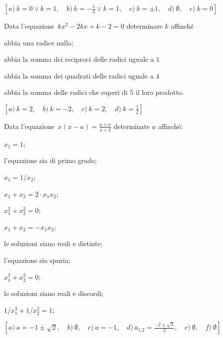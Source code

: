 \begin{flushright}
$\left[a)~ k = 0 \vee k = 1 ,\quad b)~ k =-\frac{1}{3} \vee k = 1 
,\quad c)~ k = \pm 1 ,\quad d)~ \emptyset ,\quad e)~ k=0 \right]$
\end{flushright}

\begin{esercizio}[\Ast]
 \label{ese:3.102}
Data l'equazione~$kx^{2}-2kx + k-2 = 0$ determinare $k$ affinché
\begin{enumeratea}
\item abbia una radice nulla;~
\item abbia la somma dei reciproci delle radici uguale a $1$
\item abbia la somma dei quadrati delle radici uguale a $4$
\item abbia la somma delle radici che superi di $5$ il loro prodotto.
\end{enumeratea}
\end{esercizio}

\begin{flushright}
$\left[a)~ k = 2 ,\quad b)~ k = -2 ,\quad c)~ k = 2 ,\quad 
d)~ k = \frac{1}{2} \right]$
\end{flushright}

\begin{esercizio}[\Ast]
 \label{ese:3.103}
Data l'equazione~$x (x-a) = \frac{a + x}{a + 2}$ determinate $a$ affinché:
\begin{multicols}{2}
\begin{enumeratea}
\item $x_1 = 1$;
\item l'equazione sia di primo grado;
\item $x_1 = 1 / x_2$;
\item $x_1 + x_2 = 2 \cdot x_1 x_2$;
\item $x_1^2 + x_2^2 = 0$;
\item $x_1 + x_2 = - x_1 x_2$;
\item le soluzioni siano reali e distinte;
\item l'equazione sia spuria;
\item $x_1^3 + x_2^3 = 0$;
\item le soluzioni siano reali e discordi;
\item $1/x_1^3 + 1/x_2^3 = 1$;
\end{enumeratea}
\end{multicols}
\end{esercizio}

\begin{flushright}
$\left[a)~ a =-1 \pm \sqrt{2} ,\quad b)~ \emptyset ,\quad c)~ a 
=-1 ,\quad d)~ a_{1.2} =\frac{- 2 \pm \sqrt{3}}{2} ,\quad e)~ \emptyset 
,\quad f)~ \emptyset \right]$
\end{flushright}

